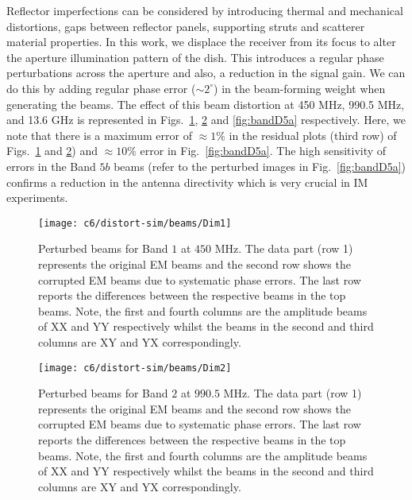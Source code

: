 Reflector imperfections can be considered by introducing thermal and mechanical distortions, gaps between reflector panels,
supporting struts and scatterer material properties. In this work, we displace the receiver from its focus to alter 
the aperture illumination pattern of the dish. This introduces a regular phase perturbations across the aperture and also,
a reduction in the signal gain. We can do this by adding regular phase error ($\sim 2^\circ$) in the beam-forming weight when generating the beams.
The effect of this beam distortion at 450 MHz, 990.5 MHz, and 13.6 GHz is represented in Figs.~\ref{fig:bandD1},  \ref{fig:bandD2}
and \ref{fig:bandD5a} respectively. Here, we note that there is a maximum error of $\approx 1\%$ in the residual plots (third row) of Figs.~\ref{fig:bandD1} and  \ref{fig:bandD2})
and $\approx 10\%$ error in Fig.~\ref{fig:bandD5a}. The high sensitivity of errors in the Band $5b$ beams (refer to the perturbed images in Fig.~\ref{fig:bandD5a}) 
confirms a reduction in the antenna directivity which is very crucial
in  IM experiments.
\begin{figure}
\begin{minipage}[H]{\linewidth}
\centering
\texttt{[image: c6/distort-sim/beams/Dim1]}
\caption{\label{fig:bandD1} Perturbed beams for Band $1$ at $450$ MHz. The data part (row 1) represents the original EM beams and the 
second row shows the corrupted EM beams due to systematic phase errors. The last row reports the differences between the respective beams in the top beams.  Note, the first and fourth columns are the amplitude beams of XX and YY respectively whilst the beams in the second and third columns are XY and YX correspondingly.}
\end{minipage}
\end{figure}
\FloatBarrier

\begin{figure}
\begin{minipage}[H]{\linewidth}
\centering
\texttt{[image: c6/distort-sim/beams/Dim2]}
\caption{\label{fig:bandD2} Perturbed beams for Band $2$ at $990.5$ MHz. The data part (row 1) represents the original EM beams and the 
second row shows the corrupted EM beams due to systematic phase errors. The last row reports the differences between the respective beams in the top beams. Note, the first and fourth columns are the amplitude beams of XX and YY respectively whilst the beams in the second and third columns are XY and YX correspondingly.}
\end{minipage}
\end{figure}
\FloatBarrier


